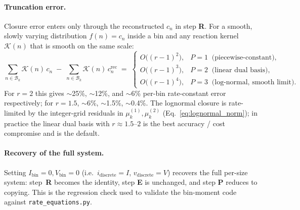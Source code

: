 \paragraph{Truncation error.}
Closure error enters only through the reconstructed $c_n$ in step
\textbf{R}. For a smooth, slowly varying distribution
$f(n) = c_n$ inside a bin and any reaction kernel
$\mathcal{K}(n)$ that is smooth on the same scale:
\begin{equation}\label{eq:truncation_error}
    \sum_{n \in \mathcal{B}_k} \mathcal{K}(n)\,c_n
    \;-\;
    \sum_{n \in \mathcal{B}_k} \mathcal{K}(n)\,c_n^{\mathrm{rec}}
    \;=\;
    \begin{cases}
      O\!\bigl((r-1)^2\bigr), & P = 1\;\;\text{(piecewise-constant)}, \\
      O\!\bigl((r-1)^3\bigr), & P = 2\;\;\text{(linear dual basis)}, \\
      O\!\bigl((r-1)^4\bigr), & P = 3\;\;\text{(log-normal, smooth limit)}.
    \end{cases}
\end{equation}
For $r = 2$ this gives $\sim$25\%, $\sim$12\%, and $\sim$6\% per-bin
rate-constant error respectively; for $r = 1.5$, $\sim$6\%, $\sim$1.5\%,
$\sim$0.4\%. The lognormal closure is rate-limited by the integer-grid
residuals in $\mu_k^{(1)}, \mu_k^{(2)}$
(Eq.~\ref{eq:lognormal_norm}); in practice the linear dual basis with
$r \approx 1.5\text{--}2$ is the best accuracy / cost compromise and
is the default.

\paragraph{Recovery of the full system.}
Setting $I_{\mathrm{bin}} = 0, V_{\mathrm{bin}} = 0$ (i.e.\
$i_{\mathrm{discrete}} = I$, $v_{\mathrm{discrete}} = V$) recovers the
full per-size system: step~\textbf{R} becomes the identity, step
\textbf{E} is unchanged, and step \textbf{P} reduces to copying.
This is the regression check used to validate the bin-moment code
against \texttt{rate\_equations.py}.
